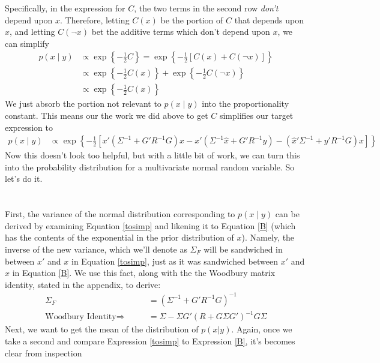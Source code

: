 \documentclass[a4paper,12pt]{scrartcl}
\begin{document}
Specifically, in the expression for $C$, the two terms
in the second row \emph{don't} depend upon $x$. Therefore,
letting $C(x)$ be the portion of $C$ that depends upon
$x$, and letting $C(\lnot x)$ bet the additive terms which
don't depend upon $x$, we can simplify
\begin{align*}
    p(x\; | \; y) &\propto \exp\left\{ -\frac{1}{2}
	C \right\} = \exp\left\{ -\frac{1}{2}
	\left[C(x) + C(\lnot x) \right]\right\}  \\
    &\propto \exp\left\{ -\frac{1}{2}
	C(x)\right\} +  \exp\left\{ -\frac{1}{2} C(\lnot x) 
	\right\}  \\
    &\propto \exp\left\{ -\frac{1}{2}
	C(x)\right\}
\end{align*}
We just absorb the portion not relevant to $p(x\;|\;y)$ into
the proportionality constant.  This means our the work we
did above to get $C$ simplifies our target expression to
\begin{align}
    p(x\;|\;y) &\propto \exp\left\{-\frac{1}{2} \left[
	x' \left( \Sigma^{-1} + G'R^{-1}G\right) x 
	- x' (\Sigma^{-1} \hat{x} + G'R^{-1}y)
	- (\hat{x}' \Sigma^{-1} + y' R^{-1}G) x  \right]\right\}
	\label{tosimp}
\end{align}
Now this doesn't look too helpful, but with a little bit of 
work, we can turn this into the probability distribution
for a multivariate normal random variable. So let's do it.
\\
\\
\\
First, the variance of the 
normal distribution corresponding to $p(x\;|\;y)$ can
be derived by examining Equation \ref{tosimp} and likening
it to Equation \ref{B} (which has the contents of the 
exponential in the prior distribution of $x$).  
Namely, the inverse of the new variance,
which we'll denote as $\Sigma_F$ will be sandwiched in 
between $x'$ and $x$ in Equation \ref{tosimp}, just as it 
was sandwiched between $x'$ and $x$ in Equation \ref{B}.
We use this fact, along with the 
the Woodbury matrix identity, stated in 
the appendix, to derive:
\begin{align*}
    \Sigma_{F} &= \left( \Sigma^{-1} + G'R^{-1}G\right)^{-1} \\
    \text{Woodbury Identity} \Rightarrow
	\qquad &=  \Sigma - \Sigma G'(R 
	    + G\Sigma G')^{-1}
	    G\Sigma
\end{align*}
Next, we want to get the mean of the distribution of 
$p(x|y)$.  Again, once we
take a second and compare Expression \ref{tosimp}
to Expression \ref{B}, it's becomes clear from inspection 
\end{document}
